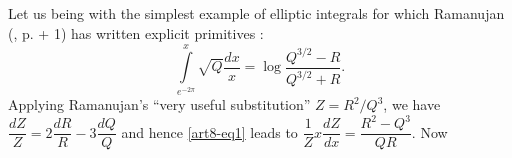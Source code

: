 \subsection{}\label{art8-sec2.1}
Let us being with the simplest example of elliptic integrals for which Ramanujan (\cite{art8-key11}, p.  + 1) has written explicit primitives :
\begin{equation}
\int\limits^{x}_{e^{-2\pi}}\sqrt{Q}\dfrac{dx}{x}=\log \frac{Q^{3/2}-R}{Q^{3/2}+R}.\label{art8-eq13}
\end{equation}
Applying Ramanujan's ``very useful substitution'' $Z=R^{2}/Q^{3}$, we have $\dfrac{dZ}{Z}=2\dfrac{dR}{R}-3\dfrac{dQ}{Q}$ and hence \eqref{art8-eq1} leads to $\dfrac{1}{Z}x\dfrac{dZ}{dx}=\dfrac{R^{2}-Q^{3}}{QR}$. Now 
